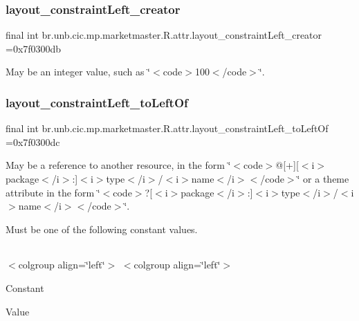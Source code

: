 \subsubsection{\texorpdfstring{layout\+\_\+constraint\+Left\+\_\+creator}{layout\_constraintLeft\_creator}}
{\footnotesize\ttfamily final int br.\+unb.\+cic.\+mp.\+marketmaster.\+R.\+attr.\+layout\+\_\+constraint\+Left\+\_\+creator =0x7f0300db\hspace{0.3cm}{\ttfamily [static]}}

May be an integer value, such as \char`\"{}$<$code$>$100$<$/code$>$\char`\"{}. \mbox{\label{classbr_1_1unb_1_1cic_1_1mp_1_1marketmaster_1_1R_1_1attr_ae3f03e195ba63d89b6ab740b3a1cd38b}} 
\subsubsection{\texorpdfstring{layout\+\_\+constraint\+Left\+\_\+to\+Left\+Of}{layout\_constraintLeft\_toLeftOf}}
{\footnotesize\ttfamily final int br.\+unb.\+cic.\+mp.\+marketmaster.\+R.\+attr.\+layout\+\_\+constraint\+Left\+\_\+to\+Left\+Of =0x7f0300dc\hspace{0.3cm}{\ttfamily [static]}}

May be a reference to another resource, in the form \char`\"{}$<$code$>$@\mbox{[}+\mbox{]}\mbox{[}$<$i$>$package$<$/i$>$\+:\mbox{]}$<$i$>$type$<$/i$>$/$<$i$>$name$<$/i$>$$<$/code$>$\char`\"{} or a theme attribute in the form \char`\"{}$<$code$>$?\mbox{[}$<$i$>$package$<$/i$>$\+:\mbox{]}$<$i$>$type$<$/i$>$/$<$i$>$name$<$/i$>$$<$/code$>$\char`\"{}. 

Must be one of the following constant values.

\tabulinesep=1mm
\begin{longtabu} spread 0pt [c]{*{0}{|X[-1]}|}
\hline
\end{longtabu}
$<$colgroup align=\char`\"{}left\char`\"{}$>$ $<$colgroup align=\char`\"{}left\char`\"{}$>$ 

Constant

Value

